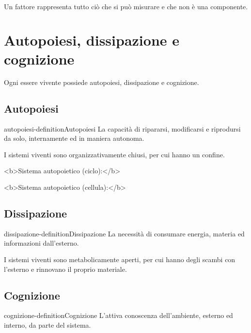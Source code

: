 \documentclass[preview]{standalone}
\begin{document}
\begin{plainhtml}
    Un fattore rappresenta tutto ciò che si può misurare e che non è una componente.
\end{plainhtml}

\section{Autopoiesi, dissipazione e cognizione}

\begin{plainhtml}
    Ogni essere vivente possiede autopoiesi, dissipazione e cognizione.
\end{plainhtml}

\subsection{Autopoiesi}

\begin{snippetdefinition}{autopoiesi-definition}{Autopoiesi}
    La capacità di ripararsi, modificarsi e riprodursi da solo, internamente ed in maniera autonoma.
\end{snippetdefinition}

\begin{plainhtml}
    I sistemi viventi sono organizzativamente chiusi, per cui hanno un confine.
\end{plainhtml}

\begin{plainhtml}
    <b>Sistema autopoietico (ciclo):</b>
\end{plainhtml}


\begin{plainhtml}
    <b>Sistema autopoietico (cellula):</b>
\end{plainhtml}


\subsection{Dissipazione}

\begin{snippetdefinition}{dissipazione-definition}{Dissipazione}
    La necessità di consumare energia, materia ed informazioni dall'esterno.
\end{snippetdefinition}

\begin{plainhtml}
    I sistemi viventi sono metabolicamente aperti, per cui hanno degli scambi con l'esterno
    e rinnovano il proprio materiale.
\end{plainhtml}

\subsection{Cognizione}

\begin{snippetdefinition}{cognizione-definition}{Cognizione}
    L'attiva conoscenza dell'ambiente, esterno ed interno, da parte del sistema.
\end{snippetdefinition}
\end{document}
